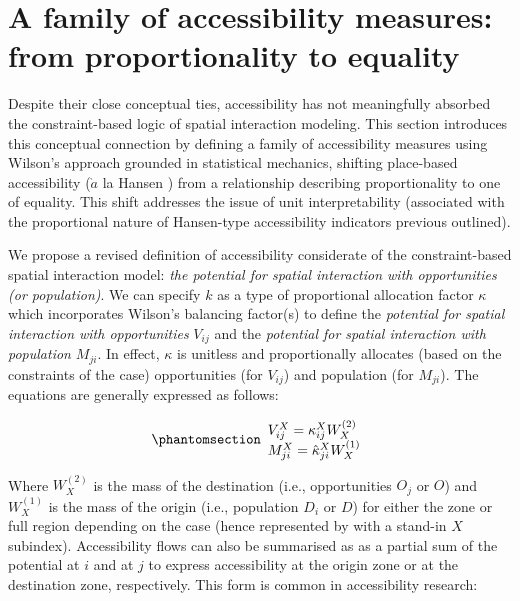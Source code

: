 \documentclass[
  10pt,
  letterpaper,
]{article}
\begin{document}
\section{A family of accessibility measures: from proportionality to
equality}\label{a-family-of-accessibility-measures-from-proportionality-to-equality}

Despite their close conceptual ties, accessibility has not meaningfully
absorbed the constraint-based logic of spatial interaction modeling.
This section introduces this conceptual connection by defining a family
of accessibility measures using Wilson's approach grounded in
statistical mechanics, shifting place-based accessibility (\(\grave{a}\)
la Hansen \citep{hansen1959}) from a relationship describing
proportionality to one of equality. This shift addresses the issue of
unit interpretability (associated with the proportional nature of
Hansen-type accessibility indicators previous outlined).

We propose a revised definition of accessibility considerate of the
constraint-based spatial interaction model: \emph{the potential for
spatial interaction with opportunities (or population)}. We can specify
\(k\) as a type of proportional allocation factor \(\kappa\) which
incorporates Wilson's balancing factor(s) to define the \emph{potential
for spatial interaction with opportunities} \(V_{ij}\) and the
\emph{potential for spatial interaction with population} \(M_{ji}\). In
effect, \(\kappa\) is unitless and proportionally allocates (based on
the constraints of the case) opportunities (for \(V_{ij}\)) and
population (for \(M_{ji}\)). The equations are generally expressed as
follows:

\begin{equation}\phantomsection\label{eq-access-01}{
\begin{array}{l}
V_{ij}^X = \kappa_{ij}^X W_X^{(2)}\\ 
M_{ji}^X = \hat \kappa_{ji}^X W_X^{(1)}
\end{array}
}\end{equation}

\noindent Where \(W_X^{(2)}\) is the mass of the destination (i.e.,
opportunities \(O_j\) or \(O\)) and \(W_X^{(1)}\) is the mass of the
origin (i.e., population \(D_i\) or \(D\)) for either the zone or full
region depending on the case (hence represented by with a stand-in \(X\)
subindex). Accessibility flows can also be summarised as as a partial
sum of the potential at \(i\) and at \(j\) to express accessibility at
the origin zone or at the destination zone, respectively. This form is
common in accessibility research:
\end{document}
